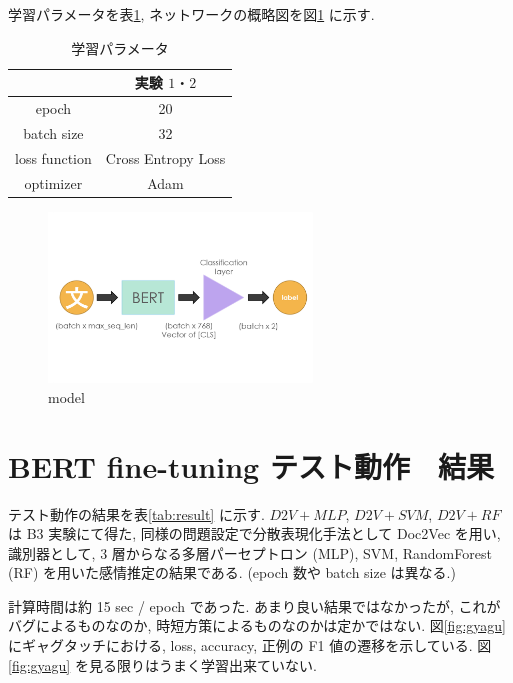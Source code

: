 \documentclass[twocolumn]{jarticle}     %
\begin{document}
学習パラメータを表\ref{table:ex_para}, ネットワークの概略図を図\ref{fig:net} に示す.

\begin{table}
\caption{学習パラメータ}
\label{table:ex_para}
\centering
\begin{tabular}{|c||c|c|}
\hline
& \multicolumn{2}{|c|}{実験 $1・2$} \\ \hline
epoch & \multicolumn{2}{|c|}{20}  \\ \hline
batch size & \multicolumn{2}{|c|}{32} \\ \hline
loss function & \multicolumn{2}{|c|}{Cross Entropy Loss} \\ \hline
optimizer & \multicolumn{2}{|c|}{Adam} \\ \hline
\end{tabular}
\end{table}


\begin{figure}[htb]
  \begin{center} %
    \includegraphics[width=7.0cm]{net.png}
    \caption{model} %
    \label{fig:net} %
  \end{center}
\end{figure}

\section{BERT fine-tuning テスト動作　結果}
テスト動作の結果を表\ref{tab:result} に示す.
$D2V + MLP$, $D2V + SVM$, $D2V + RF$ は B3 実験にて得た, 同様の問題設定で分散表現化手法として Doc2Vec を用い, 識別器として, 3 層からなる多層パーセプトロン (MLP), SVM, RandomForest (RF) を用いた感情推定の結果である. (epoch 数や batch size は異なる.)

計算時間は約 15 sec / epoch であった. あまり良い結果ではなかったが, これがバグによるものなのか, 時短方策によるものなのかは定かではない. 図\ref{fig:gyagu} にギャグタッチにおける, loss, accuracy, 正例の F1 値の遷移を示している. 図\ref{fig:gyagu} を見る限りはうまく学習出来ていない.
\end{document}
